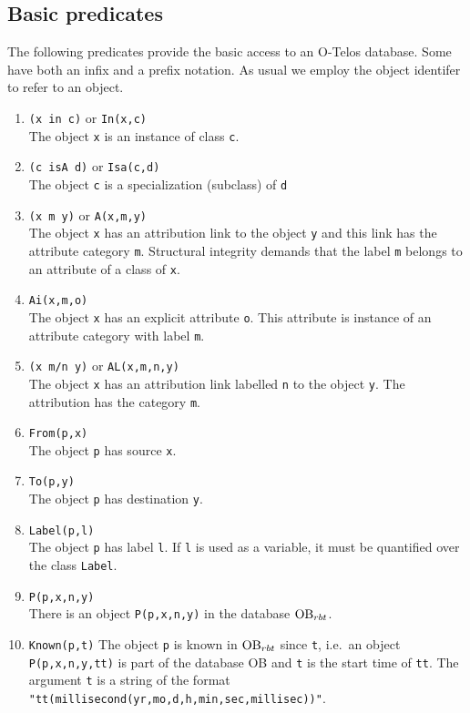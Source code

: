 \subsection{Basic predicates}
The following predicates
provide the basic access to an O-Telos database. Some have both an
infix and a prefix notation. As usual we employ the object identifer to refer to an object.


\begin{enumerate}
\item {\tt (x in c)} or {\tt In(x,c)}\\
The object {\tt x} is an instance of class {\tt c}.
\item {\tt (c isA d)}  or {\tt Isa(c,d)}\\
The object {\tt c} is a specialization (subclass) of {\tt d}
\item {\tt (x m y)} or {\tt A(x,m,y)}\\
The object {\tt x} has an attribution link to the object  {\tt y} and this link
has the attribute category  {\tt m}.
Structural integrity demands that the label {\tt m} belongs to an attribute of a class
of {\tt x}.
\item {\tt Ai(x,m,o)}\\
The object {\tt x} has an explicit attribute {\tt o}. This attribute is instance of
an attribute category with label {\tt m}.
\item {\tt (x m/n y)} or {\tt AL(x,m,n,y)}\\
The object {\tt x} has an attribution link labelled {\tt n} to the object  {\tt y}. The attribution has the
category {\tt m}.
\item {\tt From(p,x)}\\
The object {\tt p} has source {\tt x}.
\item {\tt To(p,y)}\\
The object {\tt p} has destination {\tt y}.
\item {\tt Label(p,l)}\\
The object {\tt p} has label {\tt l}. If {\tt l} is used as a variable, it must be quantified over the
class {\tt Label}.
\item {\tt P(p,x,n,y)}\\
There is an object {\tt P(p,x,n,y)} in the database $\hbox{\rm OB}_{rbt}$.
\item {\tt Known(p,t)}
The object {\tt p} is known in $\hbox{\rm OB}_{rbt}$  since {\tt t}, i.e.\ an object {\tt P(p,x,n,y,tt)} is
part of the database OB and {\tt t} is the start time of {\tt tt}. The argument
{\tt t} is a string of the format \verb+"tt(millisecond(yr,mo,d,h,min,sec,millisec))"+.

\end{enumerate}
